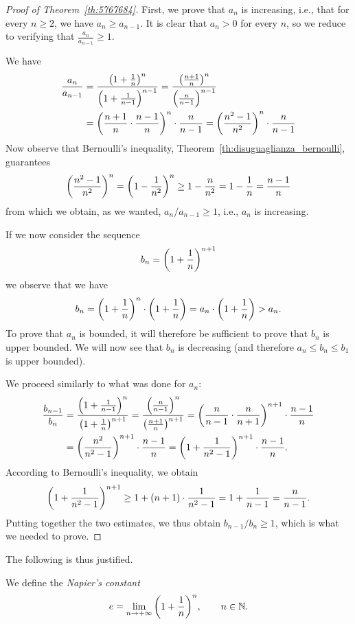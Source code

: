 \begin{proof}[Proof of Theorem~\ref{th:5767684}]
First, we prove that $a_n$ is increasing, i.e., that
for every $n\ge 2$, we have $a_n \ge a_{n-1}$.
It is clear that $a_n>0$ for every $n$,
so we reduce to
verifying that $\frac{a_n}{a_{n-1}} \ge 1$.

We have
\begin{align*}
\frac{a_n}{a_{n-1}}
&= \frac{{\left( 1+\frac 1 n \right)}^n}{{\left( 1+\frac 1 {n-1} \right)}^{n-1}}
= \frac{{\left( \frac{n+1}{n} \right)}^n}{{\left( \frac{n}{n-1} \right)}^{n-1}}\\
&= {\left( \frac{n+1}{n}\cdot\frac{n-1}{n} \right)}^n \cdot \frac{n}{n-1}
= {\left( \frac{n^2- 1}{n^2} \right)}^n \cdot \frac{n}{n-1}
\end{align*}
Now observe that Bernoulli's inequality, 
Theorem~\ref{th:disuguaglianza_bernoulli},
guarantees
\[
  {\left( \frac{n^2 -1}{n^2} \right)}^n
  = {\left( 1-\frac{1}{n^2} \right)}^n
  \ge 1 - \frac{n}{n^2} = 1 - \frac{1}{n} = \frac{n-1}{n}
\]
from which we obtain, as we wanted, $a_n / a_{n-1} \ge 1$, i.e.,
$a_n$ is increasing.

If we now consider the sequence
\[
  b_n = {\left( 1+\frac 1 n \right)}^{n+1}
\]
we observe that we have
\[
  b_n = {\left( 1+\frac 1 n \right)}^n \cdot {\left( 1+\frac 1 n \right)}
   = a_n\cdot {\left( 1+\frac 1 n \right)} > a_n.
\]
To prove that $a_n$ is bounded, it will therefore be sufficient to prove
that $b_n$ is upper bounded. We will now see that $b_n$ is decreasing (and
therefore $a_n \le b_n \le b_1$ is upper bounded).

We proceed similarly to what was done for $a_n$:
\begin{align*}
\frac{b_{n-1}}{b_n}
& = \frac{{\left( 1+\frac{1}{n-1} \right)}^n}{{\left( 1+\frac{1}{n} \right)}^{n+1}}
  = \frac{{\left( \frac{n}{n-1} \right)}^n}{{\left( \frac{n+1}{n} \right)}^{n+1}}
  = {\left( \frac{n}{n-1}\cdot\frac{n}{n+1} \right)}^{n+1}\cdot\frac{n-1}{n} \\
& = {\left( \frac{n^2}{n^2-1} \right)}^{n+1} \cdot \frac{n-1}{n}
  = {\left( 1 + \frac{1}{n^2-1} \right)}^{n+1} \cdot \frac{n-1}{n}.
\end{align*}
According to Bernoulli's inequality, we obtain
\[
  {\left( 1 + \frac{1}{n^2-1} \right)}^{n+1}
  \ge 1 + (n+1) \cdot \frac{1}{n^2-1}
  = 1 + \frac{1}{n-1} = \frac{n}{n-1}.
\]
Putting together the two estimates, we thus obtain $b_{n-1}/b_n \ge 1$,
which is what we needed to prove.
\end{proof}

The following is thus justified.

\begin{definition}
\mymark{***}
We define the \emph{Napier's constant}%
%
%
%
%
\[
  e = \lim_{n\to +\infty} {\left( 1+\frac 1 n \right)}^n,
  \qquad n\in{\mathbb N}.
\]
\end{definition}

